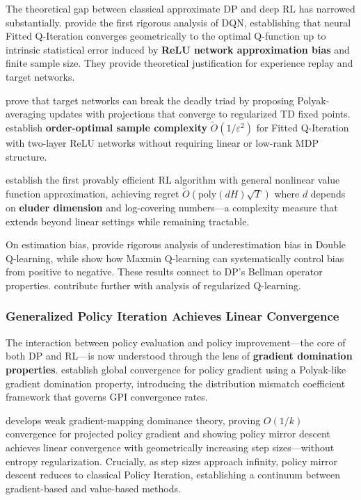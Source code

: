 The theoretical gap between classical approximate DP and deep RL has narrowed substantially. \citet{fan2020dqn} provide the first rigorous analysis of DQN, establishing that neural Fitted Q-Iteration converges geometrically to the optimal Q-function up to intrinsic statistical error induced by \textbf{ReLU network approximation bias} and finite sample size. They provide theoretical justification for experience replay and target networks.

\citet{zhang2021target} prove that target networks can break the deadly triad by proposing Polyak-averaging updates with projections that converge to regularized TD fixed points. \citet{gaur2023fqi} establish \textbf{order-optimal sample complexity} $\tilde{O}(1/\varepsilon^2)$ for Fitted Q-Iteration with two-layer ReLU networks without requiring linear or low-rank MDP structure.

\citet{wang2020eluder} establish the first provably efficient RL algorithm with general nonlinear value function approximation, achieving regret $\tilde{O}(\mathrm{poly}(dH)\sqrt{T})$ where $d$ depends on \textbf{eluder dimension} and log-covering numbers---a complexity measure that extends beyond linear settings while remaining tractable.

On estimation bias, \citet{ren2021underestimation} provide rigorous analysis of underestimation bias in Double Q-learning, while \citet{lan2020maxmin} show how Maxmin Q-learning can systematically control bias from positive to negative. These results connect to DP's Bellman operator properties. \citet{lim2024regularized} contribute further with analysis of regularized Q-learning.

\subsubsection{Generalized Policy Iteration Achieves Linear Convergence}

The interaction between policy evaluation and policy improvement---the core of both DP and RL---is now understood through the lens of \textbf{gradient domination properties}. \citet{agarwal2021theory} establish global convergence for policy gradient using a Polyak-like gradient domination property, introducing the distribution mismatch coefficient framework that governs GPI convergence rates.

\citet{xiao2022convergence} develops weak gradient-mapping dominance theory, proving $O(1/k)$ convergence for projected policy gradient and showing policy mirror descent achieves linear convergence with geometrically increasing step sizes---without entropy regularization. Crucially, as step sizes approach infinity, policy mirror descent reduces to classical Policy Iteration, establishing a continuum between gradient-based and value-based methods.


